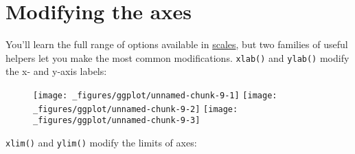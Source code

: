 \hypertarget{sec:axes}{\section{Modifying the axes}\label{sec:axes}}

You'll learn the full range of options available in
\protect\hyperlink{cha:scales}{scales}, but two families of useful
helpers let you make the most common modifications. \texttt{xlab()} and
\texttt{ylab()} modify the x- and y-axis labels: 

\begin{Shaded}
\begin{Highlighting}[]
\StringTok{  }\NormalTok{(}  \NormalTok{/}\StringTok{ }\NormalTok{)}

\StringTok{  }\NormalTok{(}  \NormalTok{/}\StringTok{ }\NormalTok{) +}\StringTok{ }
\StringTok{  }\NormalTok{(}\NormalTok{) +}\StringTok{ }
\StringTok{  }\NormalTok{(}\NormalTok{)}

\StringTok{  }\NormalTok{(}  \NormalTok{/}\StringTok{ }\NormalTok{) +}\StringTok{ }
\StringTok{  }\NormalTok{(}\NormalTok{) +}\StringTok{ }
\StringTok{  }\NormalTok{(}\NormalTok{)}
\end{Highlighting}
\end{Shaded}

\begin{figure}[H]
  \texttt{[image: \_figures/ggplot/unnamed-chunk-9-1]}%
  \texttt{[image: \_figures/ggplot/unnamed-chunk-9-2]}%
  \texttt{[image: \_figures/ggplot/unnamed-chunk-9-3]}
\end{figure}

\texttt{xlim()} and \texttt{ylim()} modify the limits of axes:
 

